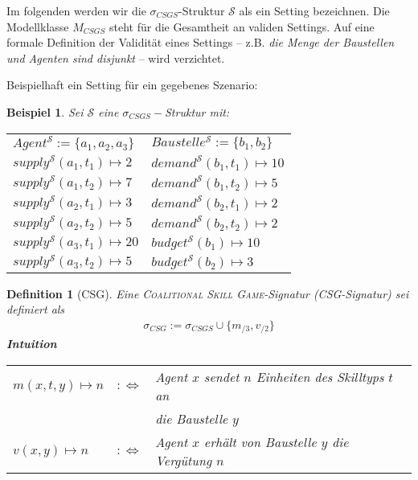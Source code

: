 \documentclass[12pt]{article}
\theoremstyle{break}
\newtheorem{definition}{Definition}
\newtheorem{bsp}{Beispiel}
\begin{document}
\noindent
Im folgenden werden wir die $\sigma_{CSGS}$-Struktur $\mathcal{S}$ als ein Setting bezeichnen. Die Modellklasse $M_{CSGS}$ steht für die Gesamtheit an validen Settings.
Auf eine formale Definition der Validität eines Settings -- z.B. \textit{die Menge der Baustellen und Agenten sind disjunkt} -- wird verzichtet.

\newpage \noindent
Beispielhaft ein Setting für ein gegebenes Szenario:
\begin{bsp}
  Sei $\mathcal{S}$ eine $\sigma_{CSGS}-$Struktur mit:\\
  
  \noindent
  \setlength{\tabcolsep}{24pt}
  \begin{tabular}{l|l}
    $Agent^\mathcal{S} := \{a_1, a_2, a_3\}$ & $Baustelle^\mathcal{S} := \{b_1, b_2\}$ \\
    $supply^\mathcal{S}(a_1, t_1)\mapsto 2 $ & $demand^\mathcal{S}(b_1, t_1)\mapsto 10$\\
    $supply^\mathcal{S}(a_1, t_2)\mapsto 7 $ & $demand^\mathcal{S}(b_1, t_2)\mapsto 5 $\\
    $supply^\mathcal{S}(a_2, t_1)\mapsto 3 $ & $demand^\mathcal{S}(b_2, t_1)\mapsto 2 $\\
    $supply^\mathcal{S}(a_2, t_2)\mapsto 5 $ & $demand^\mathcal{S}(b_2, t_2)\mapsto 2 $\\
    $supply^\mathcal{S}(a_3, t_1)\mapsto 20$ & $budget^\mathcal{S}(b_1)\mapsto 10$\\
    $supply^\mathcal{S}(a_3, t_2)\mapsto 5 $ & $budget^\mathcal{S}(b_2)\mapsto 3 $\\
  \end{tabular}
\end{bsp}

\begin{definition}[CSG]
  Eine \textsc{Coalitional Skill Game}-Signatur (CSG-Signatur) sei definiert als
  \begin{align*}
    \sigma_{CSG}:=\sigma_{CSGS}\cup\{m_{/3}, v_{/2}\}   
  \end{align*}
  \noindent
  \textbf{Intuition} \\
    \begin{tabular}{lrl}
    $m(x, t, y)\mapsto n$&$:\Leftrightarrow$& Agent $x$ sendet $n$ Einheiten des Skilltyps $t$ an \\&&die Baustelle $y$ \\
    $v(x,y)\mapsto n$&$:\Leftrightarrow$& Agent $x$ erhält von Baustelle $y$ die Vergütung $n$
    \end{tabular}
\end{definition}
\end{document}
